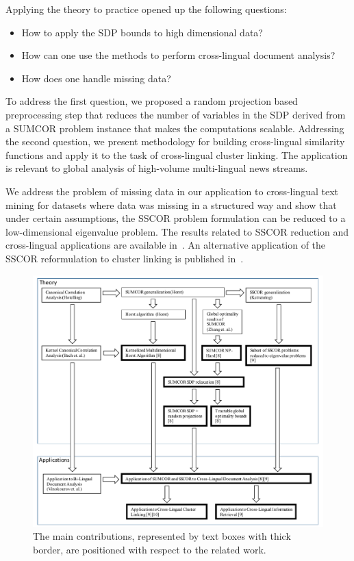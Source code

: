 Applying the theory to practice opened up the following questions:
\begin{itemize}
\item How to apply the SDP bounds to high dimensional data?
\item How can one use the methods to perform cross-lingual document analysis?
\item How does one handle missing data?
\end{itemize}
To address the first question, we proposed a random projection based preprocessing step that reduces the number
of variables in the SDP derived from a SUMCOR problem instance that makes the computations scalable. Addressing
the second question, we present methodology for building cross-lingual similarity functions and apply it
to the task of cross-lingual cluster linking. The application is relevant to global analysis of high-volume
multi-lingual news streams.

We address the problem of missing data in our application to cross-lingual text mining for datasets where
data was missing in a structured way and show that under certain assumptions, the SSCOR problem formulation
can be reduced to a low-dimensional eigenvalue problem. The results related to SSCOR reduction and
cross-lingual applications are available in~\cite{rupnikJAIR}.
An alternative application of the SSCOR reformulation to cluster linking is published in~\cite{Belyaeva201564}.

\begin{figure}[t]
\centering
\includegraphics[width=1\textwidth]{figures/position_of_work.pdf}
\caption{\label{fig:position_of_work} The main contributions, represented by text boxes with thick border, are
positioned with respect to the related work.}
\end{figure}

